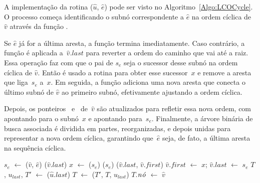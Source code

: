 A implementação da rotina \LCOCycle($\hat u$, $\hat e$) pode ser visto no Algoritmo~\ref{Algo:LCOCycle}.
O processo começa identificando o subnó correspondente a $\hat e$ na ordem cíclica de~$\hat v$ através da função \LCOFindSubNode.

Se $\hat e$ já for a última aresta, a função termina imediatamente.
Caso contrário, a função \linkcutEvert{} é aplicada a~$\hat v$.$last$ para reverter a ordem do caminho que vai até a raiz.
Essa operação faz com que o pai de $s_e$ seja o sucessor desse subnó na ordem cíclica de $\hat v$.
Então é usado a rotina \linkcutParent{} para obter esse sucessor~$x$ e remove a aresta que liga~$s_e$ a~$x$.
Em seguida, a função \linkcutAddEdge adiciona uma nova aresta que conecta o último subnó de $\hat v$ ao primeiro subnó, efetivamente ajustando a ordem cíclica.

Depois, os ponteiros~ e~ de~$\hat v$ são atualizados para refletir essa nova ordem, com  apontando para o subnó~$x$ e  apontando para~$s_e$.
Finalmente, a árvore binária de busca associada é dividida em partes, reorganizadas, e depois unidas para representar a nova ordem cíclica, garantindo que~$\hat e$ seja, de fato, a última aresta na sequência cíclica.




\begin{algorithm}[htb]
\caption{\LCOCycle($\hat v$, $\hat e$)}
\label{Algo:LCOCycle}
\begin{algorithmic}[1]
\State $s_e$ $\gets$ \LCOFindSubNode($\hat v$, $\hat e$)
\State\Return
\EndIf
\State \linkcutEvert($\hat v$.$last$)
\State $x$ $\gets$ \linkcutParent($s_e$)
\State \linkcutDelEdge($s_e$)
\State \linkcutAddEdge($\hat v$.$last$, $\hat v$.$first$)
\State $\hat v$.$first$ $\gets$ $x$; $\hat v$.$last$ $\gets$ $s_e$
\State $T$, $u_{last}$, $T'$ $\gets$ \treapSplit($\hat u$.$last$)
\State $T$ $\gets$ \treapJoin($T'$, $T$, $u_{last}$)
\State $T$.$\mathit{n\acute{o}}$ $\gets$ $\hat v$
\end{algorithmic}
\end{algorithm}


